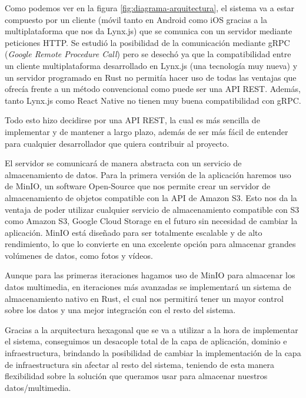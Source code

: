 Como podemos ver en la figura \ref{fig:diagrama-arquitectura}, el sistema va a estar compuesto por un cliente (móvil tanto en Android como iOS gracias a la multiplataforma que nos da Lynx.js) que se comunica con un servidor mediante peticiones HTTP.
Se estudió la posibilidad de la comunicación mediante gRPC (\textit{Google Remote Procedure Call}) pero se desechó ya que la compatibilidad entre un cliente multiplataforma desarrollado en Lynx.js (una tecnología muy nueva) y un servidor programado en Rust no permitía hacer uso de todas las ventajas que ofrecía frente a un método convencional como puede ser una API REST. Además, tanto Lynx.js como React Native no tienen muy buena compatibilidad con gRPC.

Todo esto hizo decidirse por una API REST, la cual es más sencilla de implementar y de mantener a largo plazo, además de ser más fácil de entender para cualquier desarrollador que quiera contribuir al proyecto.

El servidor se comunicará de manera abstracta con un servicio de almacenamiento de datos. Para la primera versión de la aplicación haremos uso de MinIO, un software Open-Source que nos permite crear un servidor de almacenamiento de objetos compatible con la API de Amazon S3.
Esto nos da la ventaja de poder utilizar cualquier servicio de almacenamiento compatible con S3 como Amazon S3, Google Cloud Storage en el futuro sin necesidad de cambiar la aplicación.
MinIO está diseñado para ser totalmente escalable y de alto rendimiento, lo que lo convierte en una excelente opción para almacenar grandes volúmenes de datos, como fotos y vídeos.

Aunque para las primeras iteraciones hagamos uso de MinIO para almacenar los datos multimedia, en iteraciones más avanzadas se implementará un sistema de almacenamiento nativo en Rust, el cual nos permitirá tener un mayor control sobre los datos y una mejor integración con el resto del sistema.

Gracias a la arquitectura hexagonal que se va a utilizar a la hora de implementar el sistema, conseguimos un desacople total de la capa de aplicación, dominio e infraestructura, brindando la posibilidad de cambiar la implementación de la capa de infraestructura sin afectar al resto del sistema, teniendo de esta manera flexibilidad sobre la solución que queramos usar para almacenar nuestros datos/multimedia.

